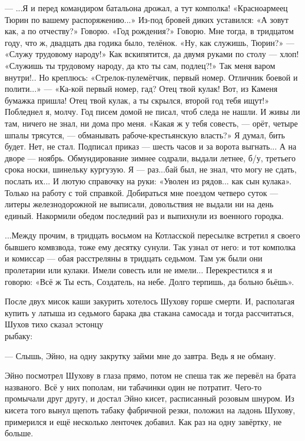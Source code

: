 --- ...Я и перед командиром батальона дрожал, а тут комполка! «Красноармеец Тюрин по вашему
распоряжению...» Из-под бровей диких уставился: «А зовут как, а по отчеству?» Говорю. «Год
рождения?» Говорю. Мне тогда, в тридцатом году, что ж, двадцать два годика было, телёнок. «Ну,
как служишь, Тюрин?» --- «Служу трудовому народу!» Как вскипятится, да двумя руками по столу ---
хлоп! «Служишь ты трудовому народу, да кто ты сам, подлец?!» Так меня варом внутри!.. Но
креплюсь: «Стрелок-пулемётчик, первый номер. Отличник боевой и полити...» --- «Ка-кой первый
номер, гад? Отец твой кулак! Вот, из Каменя бумажка пришла! Отец твой кулак, а ты скрылся,
второй год тебя ищут!» Побледнел я, молчу. Год писем домой не писал, чтоб следа не нашли. И
живы ли там, ничего не знал, ни дома про меня. «Какая ж у тебя совесть, --- орёт, четыре шпалы
трясутся, --- обманывать рабоче-крестьянскую власть?» Я думал, бить будет. Нет, не стал.
Подписал приказ --- шесть часов и за ворота выгнать... А на дворе --- ноябрь. Обмундирование
зимнее содрали, выдали летнее, б/у, третьего срока носки, шинельку кургузую. Я --- раз...бай был,
не знал, что могу не сдать, послать их... И лютую справочку на руки: «Уволен из рядов... как сын
кулака». Только на работу с той справкой. Добираться мне поездом четверо суток --- литеры
железнодорожной не выписали, довольствия не выдали ни на день единый. Накормили обедом
последний раз и выпихнули из военного городка.

...Между прочим, в тридцать восьмом на Котласской пересылке встретил я своего бывшего
комвзвода, тоже ему десятку сунули. Так узнал от него: и тот комполка и комиссар --- обая
расстреляны в тридцать седьмом. Там уж были они пролетарии или кулаки. Имели совесть или не
имели... Перекрестился я и говорю: «Всё ж Ты есть, Создатель, на небе. Долго терпишь, да больно
бьёшь».

После двух мисок каши закурить хотелось Шухову горше смерти. И, располагая купить у латыша
из седьмого барака два стакана самосада и тогда рассчитаться, Шухов тихо сказал
эстонцу\\рыбаку:

--- Слышь, Эйно, на одну закрутку займи мне до завтра. Ведь я не обману.

Эйно посмотрел Шухову в глаза прямо, потом не спеша так же перевёл на брата названого. Всё у
них пополам, ни табачинки один не потратит. Чего-то промычали друг другу, и достал Эйно кисет,
расписанный розовым шнуром. Из кисета того вынул щепоть табаку фабричной резки, положил на
ладонь Шухову, примерился и ещё несколько ленточек добавил. Как раз на одну завёртку, не
больше.


